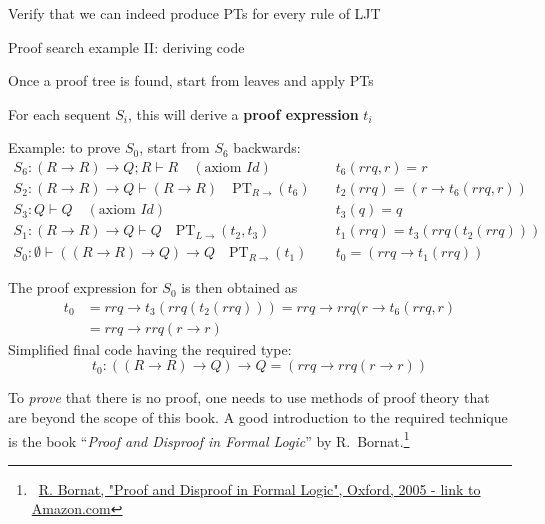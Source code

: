 Verify that we can indeed produce PTs for every rule of LJT

Proof search example II: deriving code

Once a proof tree is found, start from leaves and apply PTs

For each sequent $S_{i}$, this will derive a \textbf{proof expression}
$t_{i}$

Example: to prove $S_{0}$, start from $S_{6}$ backwards:{\footnotesize{}
\begin{align*}
S_{6}:\left(R\rightarrow R\right)\rightarrow Q;R\vdash R\quad(\text{axiom }Id)\quad & t_{6}(rrq,r)=r\\
S_{2}:\left(R\rightarrow R\right)\rightarrow Q\vdash\left(R\rightarrow R\right)\quad\text{PT}_{R\rightarrow}(t_{6})\quad & t_{2}(rrq)=\left(r\rightarrow t_{6}(rrq,r)\right)\\
S_{3}:Q\vdash Q\quad(\text{axiom }Id)\quad & t_{3}(q)=q\\
S_{1}:\left(R\rightarrow R\right)\rightarrow Q\vdash Q\quad\text{PT}_{L\rightarrow}(t_{2},t_{3})\quad & t_{1}(rrq)=t_{3}(rrq(t_{2}(rrq)))\\
S_{0}:\emptyset\vdash\left(\left(R\rightarrow R\right)\rightarrow Q\right)\rightarrow Q\quad\text{PT}_{R\rightarrow}(t_{1})\quad & t_{0}=\left(rrq\rightarrow t_{1}(rrq)\right)
\end{align*}
}{\footnotesize\par}

The proof expression for $S_{0}$ is then obtained as
\begin{align*}
t_{0} & =rrq\rightarrow t_{3}\left(rrq\left(t_{2}\left(rrq\right)\right)\right)=rrq\rightarrow rrq(r\rightarrow t_{6}\left(rrq,r\right)\\
 & =rrq\rightarrow rrq\left(r\rightarrow r\right)
\end{align*}
Simplified final code having the required type: 
\[
t_{0}:\left(\left(R\rightarrow R\right)\rightarrow Q\right)\rightarrow Q=\left(rrq\rightarrow rrq\left(r\rightarrow r\right)\right)
\]

To \emph{prove} that there is no proof, one needs to use methods of
proof theory that are beyond the scope of this book. A good introduction
to the required technique is the book ``\emph{Proof and Disproof
in Formal Logic}'' by R.~Bornat.\footnote{~\href{https://www.amazon.com/Proof-Disproof-Formal-Logic-Introduction/dp/0198530277}{R. Bornat, "Proof and Disproof in Formal Logic", Oxford, 2005 - link to Amazon.com}} 

